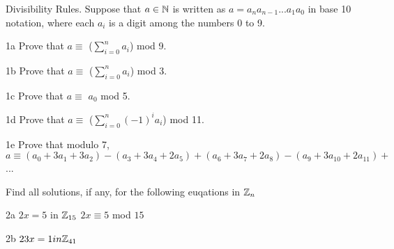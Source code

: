 \begin{question}{1}
Divisibility Rules. Suppose that $a \in \mathbb{N}$ is written as $a = a_na_{n-1}...a_1a_0$ in base 10 notation, where each $a_{i}$ is a digit among the numbers 0 to 9.
\end{question}


\begin{question}{1a}
Prove that $a\equiv$ ($\displaystyle\sum\limits_{i=0}^n a_i$) mod 9.
\end{question}

\begin{question}{1b}
Prove that $a\equiv$ ($\displaystyle\sum\limits_{i=0}^n a_i$) mod 3.
\end{question}

\begin{question}{1c}
Prove that $a\equiv$ $a_0$ mod 5.

\end{question}

\begin{question}{1d}
Prove that $a\equiv$ ($\displaystyle\sum\limits_{i=0}^n (-1)^i a_i$) mod 11.
\end{question}

\begin{question}{1e}
Prove that modulo 7, $a \equiv (a_0 + 3a_1 + 3a_2)-(a_3+3a_4+2a_5)+(a_6+3a_7+2a_8)-(a_9+3a_{10}+2a_{11})+$...
\end{question}



\begin{question}{2}
Find all solutions, if any, for the following euqations in $\mathbb{Z}_n$
\end{question}




%
%


\begin{question}{2a}
$2x = 5$ in $\mathbb{Z}_{15}$
$2x \equiv 5$ mod $15$\\
\end{question}

\begin{question}{2b}
$23x = 1 in \mathbb{Z}_{41}$
\end{question}

